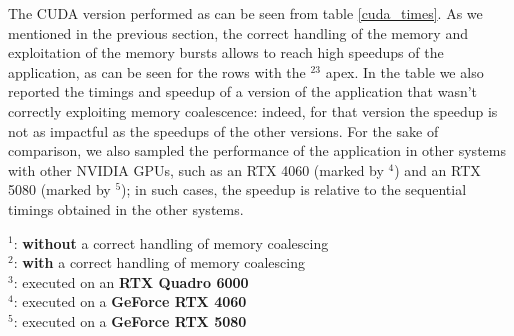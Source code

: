 \documentclass[11pt, journal]{IEEEtran}
\newcommand{\nwl}{

\vspace{11pt}

}
\begin{document}
The CUDA version performed as can be seen from table \ref{cuda_times}. As we mentioned in the previous section, the correct handling of the memory and exploitation of the memory bursts allows to reach high speedups of the application, as can be seen for the rows with the \textasteriskcentered$^{23}$ apex. In the table we also reported the timings and speedup of a version of the application that wasn't correctly exploiting memory coalescence: indeed, for that version the speedup is not as impactful as the speedups of the other versions. For the sake of comparison, we also sampled the performance of the application in other systems with other NVIDIA GPUs, such as an RTX 4060 (marked by \textasteriskcentered$^4$) and an RTX 5080 (marked by \textasteriskcentered$^5$); in such cases, the speedup is relative to the sequential timings obtained in the other systems.


\begin{table}
    \label{cuda_times}
    \centering
    \caption{Performances of the CUDA version $\left(\mu \pm \sigma^2\right)$}
    \renewcommand{\arraystretch}{1.3}
    
    \nwl
    \textasteriskcentered$^1$: \textbf{without} a correct handling of memory coalescing\\
    \textasteriskcentered$^2$: \textbf{with} a correct handling of memory coalescing\\
    \textasteriskcentered$^3$: executed on an \textbf{RTX Quadro 6000}\\
    \textasteriskcentered$^4$: executed on a \textbf{GeForce RTX 4060}\\
    \textasteriskcentered$^5$: executed on a \textbf{GeForce RTX 5080}
\end{table}
\end{document}
